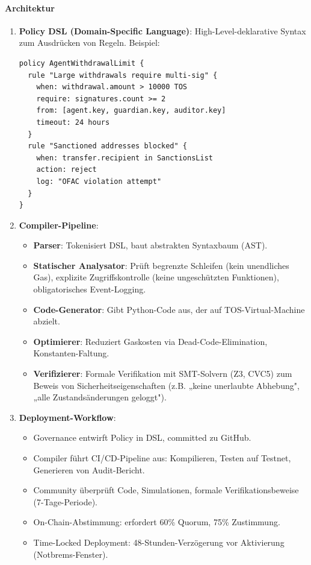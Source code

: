 \documentclass[11pt]{article}
\begin{document}
\paragraph{Architektur}
\begin{enumerate}[noitemsep]
  \item \textbf{Policy DSL (Domain-Specific Language)}: High-Level-deklarative Syntax zum Ausdrücken von Regeln. Beispiel:
  \begin{verbatim}
policy AgentWithdrawalLimit {
  rule "Large withdrawals require multi-sig" {
    when: withdrawal.amount > 10000 TOS
    require: signatures.count >= 2
    from: [agent.key, guardian.key, auditor.key]
    timeout: 24 hours
  }
  rule "Sanctioned addresses blocked" {
    when: transfer.recipient in SanctionsList
    action: reject
    log: "OFAC violation attempt"
  }
}
  \end{verbatim}
  \item \textbf{Compiler-Pipeline}:
    \begin{itemize}[noitemsep]
      \item \textbf{Parser}: Tokenisiert DSL, baut abstrakten Syntaxbaum (AST).
      \item \textbf{Statischer Analysator}: Prüft begrenzte Schleifen (kein unendliches Gas), explizite Zugriffskontrolle (keine ungeschützten Funktionen), obligatorisches Event-Logging.
      \item \textbf{Code-Generator}: Gibt Python-Code aus, der auf TOS-Virtual-Machine abzielt.
      \item \textbf{Optimierer}: Reduziert Gaskosten via Dead-Code-Elimination, Konstanten-Faltung.
      \item \textbf{Verifizierer}: Formale Verifikation mit SMT-Solvern (Z3, CVC5) zum Beweis von Sicherheitseigenschaften (z.B. „keine unerlaubte Abhebung", „alle Zustandsänderungen geloggt").
    \end{itemize}
  \item \textbf{Deployment-Workflow}:
    \begin{itemize}[noitemsep]
      \item Governance entwirft Policy in DSL, committed zu GitHub.
      \item Compiler führt CI/CD-Pipeline aus: Kompilieren, Testen auf Testnet, Generieren von Audit-Bericht.
      \item Community überprüft Code, Simulationen, formale Verifikationsbeweise (7-Tage-Periode).
      \item On-Chain-Abstimmung: erfordert 60\% Quorum, 75\% Zustimmung.
      \item Time-Locked Deployment: 48-Stunden-Verzögerung vor Aktivierung (Notbrems-Fenster).
    \end{itemize}
\end{enumerate}
\end{document}
